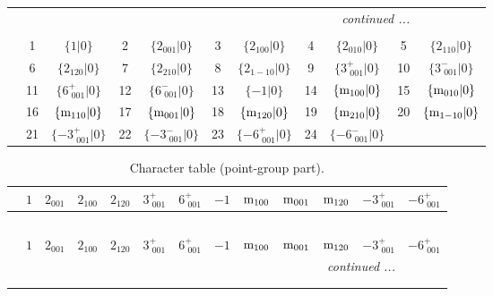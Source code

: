\documentclass[fleqn,10pt,landscape]{article}
\begin{document}
\begin{itemize}
\begin{center}
\begin{longtable}{c|cc|cc|cc|cc|cc}
 \hline \hline
\multicolumn{10}{r}{\footnotesize\it continued ...} \\ \endfoot

 \hline \hline
\multicolumn{10}{r}{} \\ \endlastfoot

 & 1 & $\{1|0\}$ & 2 & $\{2{}_{001}|0\}$ & 3 & $\{2{}_{100}|0\}$ & 4 & $\{2{}_{010}|0\}$ & 5 & $\{2{}_{110}|0\}$ \\
& 6 & $\{2{}_{120}|0\}$ & 7 & $\{2{}_{210}|0\}$ & 8 & $\{2{}_{1-10}|0\}$ & 9 & $\{3^{+}_{\,\,001}|0\}$ & 10 & $\{3^{-}_{\,\,001}|0\}$ \\
& 11 & $\{6^{+}_{\,\,001}|0\}$ & 12 & $\{6^{-}_{\,\,001}|0\}$ & 13 & $\{-1|0\}$ & 14 & $\{{\rm m}_{100}|0\}$ & 15 & $\{{\rm m}_{010}|0\}$ \\
& 16 & $\{{\rm m}_{110}|0\}$ & 17 & $\{{\rm m}_{001}|0\}$ & 18 & $\{{\rm m}_{120}|0\}$ & 19 & $\{{\rm m}_{210}|0\}$ & 20 & $\{{\rm m}_{1-10}|0\}$ \\
& 21 & $\{-3^{+}_{\,\,001}|0\}$ & 22 & $\{-3^{-}_{\,\,001}|0\}$ & 23 & $\{-6^{+}_{\,\,001}|0\}$ & 24 & $\{-6^{-}_{\,\,001}|0\}$ &  &  \\
\end{longtable}
\end{center}
\begin{center}
\renewcommand{\arraystretch}{1.0}
\begin{longtable}{c|rrrrrrrrrrrr}
\caption{Character table (point-group part).}
 \\
 \hline \hline
 & $ 1 $ & $ 2{}_{001} $ & $ 2{}_{100} $ & $ 2{}_{120} $ & $ 3^{+}_{\,\,001} $ & $ 6^{+}_{\,\,001} $ & $ -1 $ & $ {\rm m}_{100} $ & $ {\rm m}_{001} $ & $ {\rm m}_{120} $ & $ -3^{+}_{\,\,001} $ & $ -6^{+}_{\,\,001} $ \\ \hline \endfirsthead

\multicolumn{12}{l}{\tablename\ \thetable{}} \\
 \hline \hline
 & $ 1 $ & $ 2{}_{001} $ & $ 2{}_{100} $ & $ 2{}_{120} $ & $ 3^{+}_{\,\,001} $ & $ 6^{+}_{\,\,001} $ & $ -1 $ & $ {\rm m}_{100} $ & $ {\rm m}_{001} $ & $ {\rm m}_{120} $ & $ -3^{+}_{\,\,001} $ & $ -6^{+}_{\,\,001} $ \\ \hline \endhead

 \hline \hline
\multicolumn{12}{r}{\footnotesize\it continued ...} \\ \endfoot

 \hline \hline
\multicolumn{12}{r}{} \\ \endlastfoot


\end{longtable}
\end{center}
\end{itemize}
\end{document}
